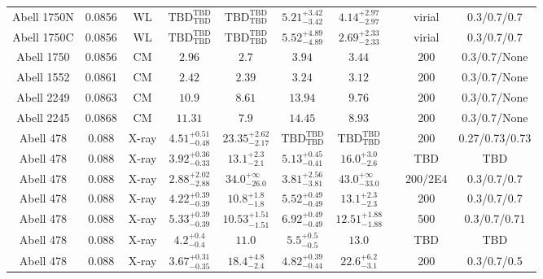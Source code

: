 \begin{table}
\begin{tabular}{cccccccccc}
Abell 1750N & 0.0856 & WL & ${\mathrm{TBD}}^{\mathrm{TBD}}_{\mathrm{TBD}}$ & ${\mathrm{TBD}}^{\mathrm{TBD}}_{\mathrm{TBD}}$ & ${5.21}^{+3.42}_{-3.42}$ & ${4.14}^{+2.97}_{-2.97}$ & \citet{OK08.1} & virial & 0.3/0.7/0.7 \\
Abell 1750C & 0.0856 & WL & ${\mathrm{TBD}}^{\mathrm{TBD}}_{\mathrm{TBD}}$ & ${\mathrm{TBD}}^{\mathrm{TBD}}_{\mathrm{TBD}}$ & ${5.52}^{+4.89}_{-4.89}$ & ${2.69}^{+2.33}_{-2.33}$ & \citet{OK08.1} & virial & 0.3/0.7/0.7 \\
Abell 1750 & 0.0856 & CM & ${2.96}^{}_{}$ & ${2.7}^{}_{}$ & ${3.94}^{}_{}$ & ${3.44}^{}_{}$ & \citet{RI06.1} & 200 & 0.3/0.7/None \\
Abell 1552 & 0.0861 & CM & ${2.42}^{}_{}$ & ${2.39}^{}_{}$ & ${3.24}^{}_{}$ & ${3.12}^{}_{}$ & \citet{RI06.1} & 200 & 0.3/0.7/None \\
Abell 2249 & 0.0863 & CM & ${10.9}^{}_{}$ & ${8.61}^{}_{}$ & ${13.94}^{}_{}$ & ${9.76}^{}_{}$ & \citet{RI06.1} & 200 & 0.3/0.7/None \\
Abell 2245 & 0.0868 & CM & ${11.31}^{}_{}$ & ${7.9}^{}_{}$ & ${14.45}^{}_{}$ & ${8.93}^{}_{}$ & \citet{RI06.1} & 200 & 0.3/0.7/None \\
Abell 478 & 0.088 & X-ray & ${4.51}^{+0.51}_{-0.48}$ & ${23.35}^{+2.62}_{-2.17}$ & ${\mathrm{TBD}}^{\mathrm{TBD}}_{\mathrm{TBD}}$ & ${\mathrm{TBD}}^{\mathrm{TBD}}_{\mathrm{TBD}}$ & \citet{BA14.1} & 200 & 0.27/0.73/0.73 \\
Abell 478 & 0.088 & X-ray & ${3.92}^{+0.36}_{-0.33}$ & ${13.1}^{+2.3}_{-2.1}$ & ${5.13}^{+0.45}_{-0.41}$ & ${16.0}^{+3.0}_{-2.6}$ & \citet{SC06.1} & TBD & TBD \\
Abell 478 & 0.088 & X-ray & ${2.88}^{+2.02}_{-2.88}$ & ${34.0}^{+\infty}_{-26.0}$ & ${3.81}^{+2.56}_{-3.81}$ & ${43.0}^{+\infty}_{-33.0}$ & \citet{VO06.1} & 200/2E4 & 0.3/0.7/0.7 \\
Abell 478 & 0.088 & X-ray & ${4.22}^{+0.39}_{-0.39}$ & ${10.8}^{+1.8}_{-1.8}$ & ${5.52}^{+0.49}_{-0.49}$ & ${13.1}^{+2.3}_{-2.3}$ & \citet{PO05.1} & 200 & 0.3/0.7/0.7 \\
Abell 478 & 0.088 & X-ray & ${5.33}^{+0.39}_{-0.39}$ & ${10.53}^{+1.51}_{-1.51}$ & ${6.92}^{+0.49}_{-0.49}$ & ${12.51}^{+1.88}_{-1.88}$ & \citet{VI05.1} & 500 & 0.3/0.7/0.71 \\
Abell 478 & 0.088 & X-ray & ${4.2}^{+0.4}_{-0.4}$ & ${11.0}^{}_{}$ & ${5.5}^{+0.5}_{-0.5}$ & ${13.0}^{}_{}$ & \citet{PO04.1} & TBD & TBD \\
Abell 478 & 0.088 & X-ray & ${3.67}^{+0.31}_{-0.35}$ & ${18.4}^{+4.8}_{-2.4}$ & ${4.82}^{+0.39}_{-0.44}$ & ${22.6}^{+6.2}_{-3.1}$ & \citet{AL03.1} & 200 & 0.3/0.7/0.5 \\

\end{tabular}
\end{table}
